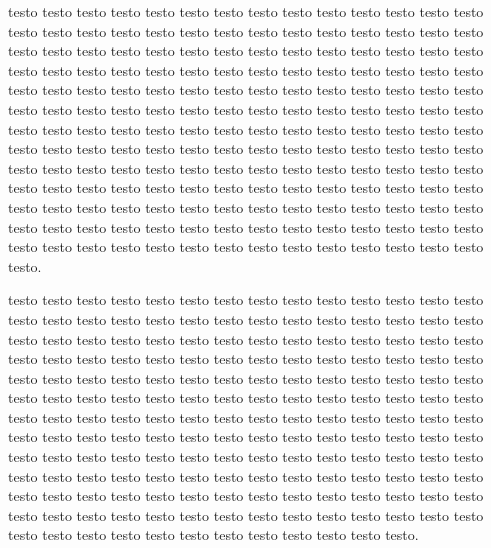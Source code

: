 \documentclass[11pt,a4paper]{book}
\begin{document}
\begin{pages}

\begin{Leftside}
\beginnumbering
 
\pstart testo testo testo testo testo testo testo testo testo testo testo testo testo testo testo testo testo testo testo testo testo testo testo testo testo testo testo testo testo testo testo testo testo testo testo testo testo testo testo testo testo testo testo testo testo testo testo testo testo testo testo testo testo testo testo testo testo testo testo testo testo testo testo testo testo testo testo testo testo testo testo testo testo testo testo testo testo testo testo testo testo testo testo testo testo testo testo testo testo testo testo testo testo testo testo testo testo testo testo testo testo testo testo testo testo testo testo testo testo testo testo testo testo testo testo testo testo testo testo testo testo testo testo testo testo testo testo testo testo testo testo testo testo testo testo testo testo testo testo testo testo testo testo testo testo testo testo testo testo testo testo testo testo testo testo testo testo testo testo testo testo testo testo testo testo testo testo testo testo testo testo testo testo testo testo testo testo testo testo testo testo testo testo.\pend

\pstart testo testo testo testo testo testo testo testo testo testo testo testo testo testo testo testo testo testo testo testo testo testo testo testo testo testo testo testo testo testo testo testo testo testo testo testo testo testo testo testo testo testo testo testo testo testo testo testo testo testo testo testo testo testo testo testo testo testo testo testo testo testo testo testo testo testo testo testo testo testo testo testo testo testo testo testo testo testo testo testo testo testo testo testo testo testo testo testo testo testo testo testo testo testo testo testo testo testo testo testo testo testo testo testo testo testo testo testo testo testo testo testo testo testo testo testo testo testo testo testo testo testo testo testo testo testo testo testo testo testo testo testo testo testo testo testo testo testo testo testo testo testo testo testo testo testo testo testo testo testo testo testo testo testo testo testo testo testo testo testo testo testo testo testo testo testo testo testo testo testo testo testo testo testo testo testo testo testo testo testo.\pend

\endnumbering
\end{Leftside}


\end{pages}
\end{document}
